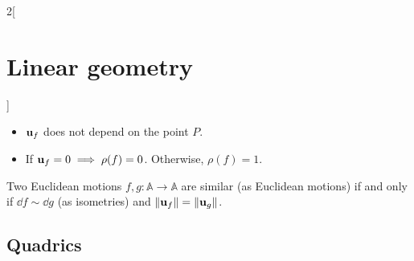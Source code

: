 \documentclass[../../../main.tex]{subfiles}
\begin{document}
\begin{multicols}{2}[\section{Linear geometry}]
\begin{prop}
\begin{itemize}
      \item $\boldsymbol{\mathrm{u}}_f$ does not depend on the point $P$.
      \item If $\boldsymbol{\mathrm{u}}_f=0\implies\rho(f)=0$. Otherwise, $\rho(f)=1$.
    \end{itemize}
  \end{prop}
  \begin{theorem}
    Two Euclidean motions $f,g:\mathbb{A}\rightarrow\mathbb{A}$ are similar (as Euclidean motions) if and only if $\dd f\sim \dd g$ (as isometries) and $\|\boldsymbol{\mathrm{u}}_f\|=\|\boldsymbol{\mathrm{u}}_g\|$.
  \end{theorem}
  \subsection{Quadrics}

\end{multicols}
\end{document}
